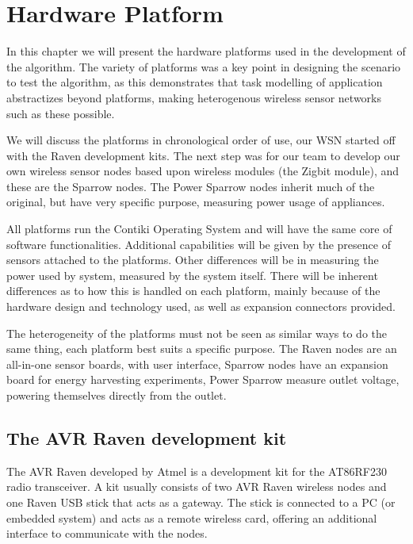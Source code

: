 \normalfont\normalsize
\chapter{Hardware Platform}

In this chapter we will present the hardware platforms used in the development of the algorithm. The variety of platforms was
a key point in designing the scenario to test the algorithm, as this demonstrates that task modelling of application abstractizes
beyond platforms, making heterogenous wireless sensor networks such as these possible.

We will discuss the platforms in chronological order of use, our WSN started off with the Raven development kits. The next step
was for our team to develop our own wireless sensor nodes based upon wireless modules (the Zigbit module), and these are the 
Sparrow nodes. The Power Sparrow nodes inherit much of the original, but have very specific purpose, measuring power usage of 
appliances.

All platforms run the Contiki Operating System and will have the same core of software functionalities. Additional capabilities will be given
by the presence of sensors attached to the platforms.  Other differences will be in measuring the power used by system, measured by the
system itself. There will be inherent differences as to how this is handled on each platform, mainly because of the hardware design and
technology used, as well as expansion connectors provided.

The heterogeneity of the platforms must not be seen as similar ways to do the same thing, each platform best suits a specific purpose.
The Raven nodes are an all-in-one sensor boards, with user interface, Sparrow nodes have an expansion board for energy harvesting 
experiments, Power Sparrow measure outlet voltage, powering themselves directly from the outlet.

\clearpage

\section{The AVR Raven development kit}



The AVR Raven developed by Atmel is a development kit for the AT86RF230 radio transceiver. A kit usually consists of two AVR Raven
wireless nodes and one Raven USB stick that acts as a gateway. The stick is connected to a PC (or embedded system) and acts as a 
remote wireless card, offering an additional interface to communicate with the nodes.

